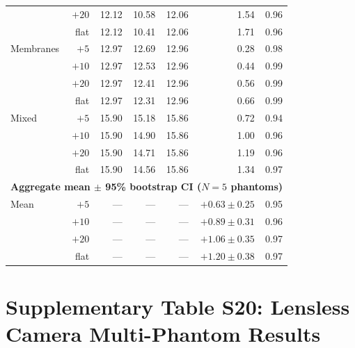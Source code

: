 \documentclass[11pt]{article}
\theoremstyle{definition}
\begin{document}
\begin{table}[htbp]
\begin{tabular}{l r r r r r r}
             & $+20$   & 12.12 & 10.58 & 12.06 & 1.54 & 0.96 \\
             & flat    & 12.12 & 10.41 & 12.06 & 1.71 & 0.96 \\
Membranes    & $+5$    & 12.97 & 12.69 & 12.96 & 0.28 & 0.98 \\
             & $+10$   & 12.97 & 12.53 & 12.96 & 0.44 & 0.99 \\
             & $+20$   & 12.97 & 12.41 & 12.96 & 0.56 & 0.99 \\
             & flat    & 12.97 & 12.31 & 12.96 & 0.66 & 0.99 \\
Mixed        & $+5$    & 15.90 & 15.18 & 15.86 & 0.72 & 0.94 \\
             & $+10$   & 15.90 & 14.90 & 15.86 & 1.00 & 0.96 \\
             & $+20$   & 15.90 & 14.71 & 15.86 & 1.19 & 0.96 \\
             & flat    & 15.90 & 14.56 & 15.86 & 1.34 & 0.97 \\
\midrule
\multicolumn{7}{l}{\textbf{Aggregate mean $\pm$ 95\% bootstrap CI ($N{=}5$ phantoms)}} \\
\midrule
Mean & $+5$    & --- & --- & --- & $+0.63 \pm 0.25$ & 0.95 \\
     & $+10$   & --- & --- & --- & $+0.89 \pm 0.31$ & 0.96 \\
     & $+20$   & --- & --- & --- & $+1.06 \pm 0.35$ & 0.97 \\
     & flat    & --- & --- & --- & $+1.20 \pm 0.38$ & 0.97 \\
\bottomrule
\end{tabular}
\end{table}


\section{Supplementary Table S20: Lensless Camera Multi-Phantom Results}
\label{sec:lensless_scenes}
\end{document}
